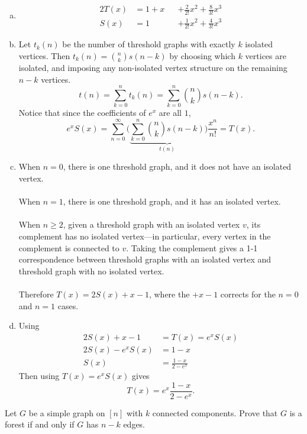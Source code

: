 \documentclass{article}
\newenvironment{problem}[2][Problem]{\begin{trivlist}
\item[\hskip \labelsep {\bfseries #1}\hskip \labelsep {\bfseries #2.}]}{\end{trivlist}}
\newenvironment{solution}[1][Solution.]{\begin{trivlist}
\item[\hskip \labelsep {\bfseries #1}]}{\end{trivlist}}
\newcommand{\paren}[1]{\biggl( #1 \biggr)}
\begin{document}
\begin{solution} \text{} \\
  \begin{enumerate}[(a)]
    \item \begin{alignat*}{2}
      T(x) &= 1 + x &&+ \frac{2}{2!}x^2 + \frac{8}{3!}x^3 \\
      S(x) &= 1     &&+ \frac{1}{2!}x^2 + \frac{4}{3!}x^3
    \end{alignat*}
    \item Let $t_k(n)$ be the number of threshold graphs with exactly $k$
    isolated vertices. Then
    $t_k(n) = \binom nk s(n-k)$ by choosing which $k$ vertices are isolated, and
    imposing any non-isolated vertex structure on the remaining $n-k$ vertices. \[
      t(n) = \sum_{k=0}^n t_k(n) = \sum_{k=0}^n \binom nk s(n-k).
    \]
    Notice that since the coefficients of $e^x$ are all $1$, \[
      e^xS(x) = \sum_{n=0}^\infty\paren{\underbrace{\sum_{k=0}^n \binom nk s(n-k)}_{t(n)}}\frac{x^n}{n!}
      = T(x).
    \]
    \item When $n = 0$, there is one threshold graph, and it does not have an
    isolated vertex.
    \\~\\
    When $n=1$, there is one threshold graph, and it has an isolated vertex.
    \\~\\
    When $n \geq 2$, given a threshold graph with an isolated vertex $v$,
    its complement has no isolated vertex---in particular, every vertex in the
    complement is connected to $v$. Taking the complement gives a 1-1
    correspondence between threshold graphs with an isolated vertex and
    threshold graph with no isolated vertex.
    \\~\\
    Therefore $T(x) = 2S(x) + x - 1$, where the $+x - 1$ corrects for the $n=0$
    and $n=1$ cases.
    \item Using \begin{align*}
      2S(x) + x - 1 &= T(x) = e^xS(x)\\
      2S(x) - e^xS(x) &= 1 - x \\
      S(x) &= \frac{1 - x}{2 - e^x}
    \end{align*} Then using $T(x) = e^xS(x)$ gives \[
      T(x) = e^x\frac{1 - x}{2 - e^x}.
    \]
  \end{enumerate}
\end{solution}
\pagebreak
%
%
\begin{problem}{3}
  Let $G$ be a simple graph on $[n]$ with $k$ connected components. Prove that
  $G$ is a forest if and only if $G$ has $n - k$ edges.
\end{problem}
\end{document}
